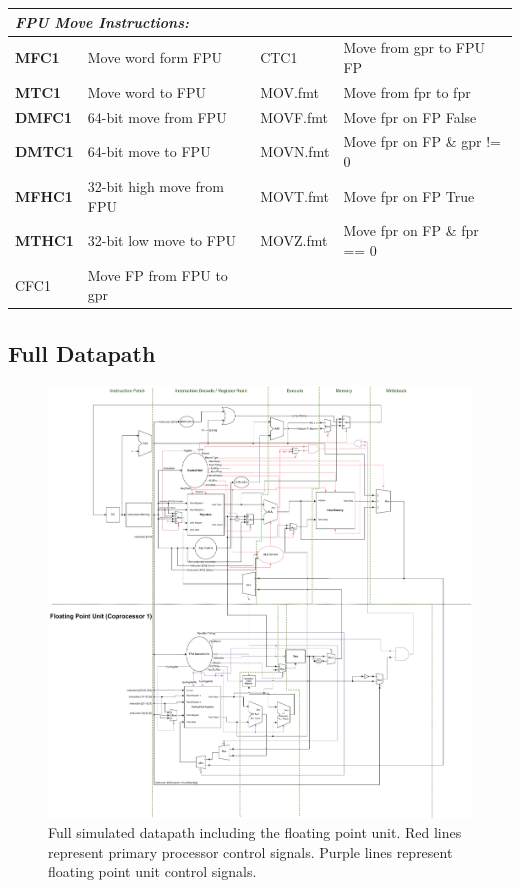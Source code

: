 \documentclass[
    parskip=half,
    fontsize=12pt,
    titlepage=firstiscover,
    toc=bibliography,
    numbers=endperiod
]{scrartcl}
\begin{document}
\begin{tabularx}{\textwidth}{@{}lX|lX@{}}
    \multicolumn{4}{l}{\emph{FPU Move Instructions:}} \\\hline
    \textbf{MFC1}  & Move word form FPU        & CTC1     & Move from gpr to FPU FP \\
    \textbf{MTC1}  & Move word to FPU          & MOV.fmt  & Move from fpr to fpr \\
    \textbf{DMFC1} & 64-bit move from FPU      & MOVF.fmt & Move fpr on FP False \\
    \textbf{DMTC1} & 64-bit move to FPU        & MOVN.fmt & Move fpr on FP \& gpr != 0 \\
    \textbf{MFHC1} & 32-bit high move from FPU & MOVT.fmt & Move fpr on FP True \\
    \textbf{MTHC1} & 32-bit low move to FPU    & MOVZ.fmt & Move fpr on FP \& fpr == 0 \\
    CFC1           & Move FP from FPU to gpr   &          & \\
\end{tabularx}

\subsection{Full Datapath}

\begin{figure}[H]
    \includegraphics[width=\textwidth]{swim-datapath}
    \caption{Full simulated datapath including the floating point unit. Red lines represent primary processor control signals. Purple lines represent floating point unit control signals.}
\end{figure}
\end{document}
